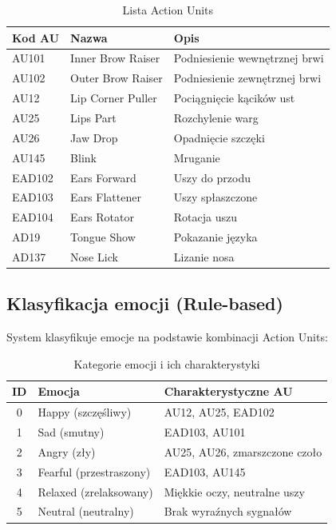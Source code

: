 \documentclass[12pt,a4paper]{article}
\begin{document}
\begin{table}[H]
\centering
\caption{Lista Action Units}
\begin{tabular}{|l|l|l|}
\hline
\textbf{Kod AU} & \textbf{Nazwa} & \textbf{Opis} \\
\hline
AU101 & Inner Brow Raiser & Podniesienie wewnętrznej brwi \\
AU102 & Outer Brow Raiser & Podniesienie zewnętrznej brwi \\
AU12 & Lip Corner Puller & Pociągnięcie kącików ust \\
AU25 & Lips Part & Rozchylenie warg \\
AU26 & Jaw Drop & Opadnięcie szczęki \\
AU145 & Blink & Mruganie \\
EAD102 & Ears Forward & Uszy do przodu \\
EAD103 & Ears Flattener & Uszy spłaszczone \\
EAD104 & Ears Rotator & Rotacja uszu \\
AD19 & Tongue Show & Pokazanie języka \\
AD137 & Nose Lick & Lizanie nosa \\
\hline
\end{tabular}
\end{table}

\subsection{Klasyfikacja emocji (Rule-based)}

System klasyfikuje emocje na podstawie kombinacji Action Units:

\begin{table}[H]
\centering
\caption{Kategorie emocji i ich charakterystyki}
\begin{tabular}{|c|l|l|}
\hline
\textbf{ID} & \textbf{Emocja} & \textbf{Charakterystyczne AU} \\
\hline
0 & Happy (szczęśliwy) & AU12, AU25, EAD102 \\
1 & Sad (smutny) & EAD103, AU101 \\
2 & Angry (zły) & AU25, AU26, zmarszczone czoło \\
3 & Fearful (przestraszony) & EAD103, AU145 \\
4 & Relaxed (zrelaksowany) & Miękkie oczy, neutralne uszy \\
5 & Neutral (neutralny) & Brak wyraźnych sygnałów \\
\hline
\end{tabular}
\end{table}
\end{document}
